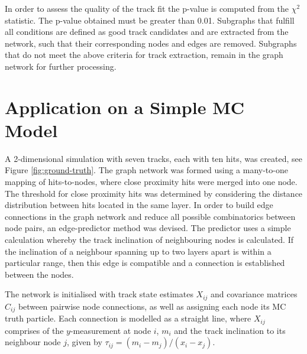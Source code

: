 In order to assess the quality of the track fit the p-value is computed from the $\chi^2$ statistic. The p-value obtained must be greater than 0.01. Subgraphs that fulfill all conditions are defined as good track candidates and are extracted from the network, such that their corresponding nodes and edges are removed. Subgraphs that do not meet the above criteria for track extraction, remain in the graph network for further processing.





\section{Application on a Simple MC Model}
\label{gnn-application-toy-model}




A 2-dimensional simulation with seven tracks, each with ten hits, was created, see Figure \ref{fig:ground-truth}. The graph network was formed using a many-to-one mapping of hits-to-nodes, where close proximity hits were merged into one node. The threshold for close proximity hits was determined by considering the distance distribution between hits located in the same layer. In order to build edge connections in the graph network and reduce all possible combinatorics between node pairs, an edge-predictor method was devised. The predictor uses a simple calculation whereby the track inclination of neighbouring nodes is calculated. If the inclination of a neighbour spanning up to two layers apart is within a particular range, then this edge is compatible and a connection is established between the nodes. 

The network is initialised with track state estimates $X_{ij}$ and covariance matrices $C_{ij}$ between pairwise node connections, as well as assigning each node its MC truth particle. Each connection is modelled as a straight line, where $X_{ij}$ comprises of the $y$-measurement at node $i$, $m_i$ and the track inclination to its neighbour node $j$, given by $\tau_{ij} = (m_i - m_j) / (x_i - x_j)$. 

